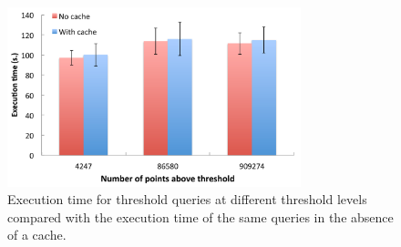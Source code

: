 \documentclass{sig-alternate}
\begin{document}
\begin{figure}
\centering
\includegraphics[width=3.35in]{Figures/cache_overhead.pdf}
\caption{Execution time for threshold queries at different threshold levels compared with the execution time of the same queries in the absence of a cache.}
\label{fig:cache_overhead}
\end{figure}
\end{document}
